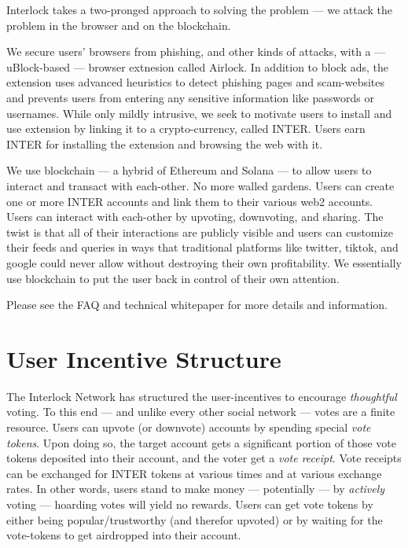 \documentclass[a4paper]{article}
\begin{document}
Interlock takes a two-pronged approach to solving the problem ---  we attack the problem in the browser and on the blockchain.

We secure users' browsers from phishing, and other kinds of attacks, with a ---  uBlock-based ---  browser extnesion called Airlock. In addition to block ads, the extension uses advanced heuristics to detect phishing pages and scam-websites and prevents users from entering any sensitive information like passwords or usernames. While only mildly intrusive, we seek to motivate users to install and use extension by linking it to a crypto-currency, called INTER. Users earn INTER for installing the extension and browsing the web with it.

We use blockchain ---  a hybrid of Ethereum and Solana ---  to allow users to interact and transact with each-other. No more walled gardens. Users can create one or more INTER accounts and link them to their various web2 accounts. Users can interact with each-other by upvoting, downvoting, and sharing. The twist is that all of their interactions are publicly visible and users can customize their feeds and queries in ways that traditional platforms like twitter, tiktok, and google could never allow without destroying their own profitability. We essentially use blockchain to put the user back in control of their own attention.

Please see the FAQ and technical whitepaper for more details and information.
\section{User Incentive Structure}
\label{User Incentive Structure}

The Interlock Network has structured the user-incentives to encourage \emph{thoughtful} voting. To this end ---  and unlike every other social network ---  votes are a finite resource. Users can upvote (or downvote) accounts by spending special \emph{vote tokens}. Upon doing so, the target account gets a significant portion of those vote tokens deposited into their account, and the voter get a \emph{vote receipt}. Vote receipts can be exchanged for INTER tokens at various times and at various exchange rates. In other words, users stand to make money ---  potentially ---  by \emph{actively} voting ---  hoarding votes will yield no rewards. Users can get vote tokens by either being popular/trustworthy (and therefor upvoted) or by waiting for the vote-tokens to get airdropped into their account.
\end{document}
